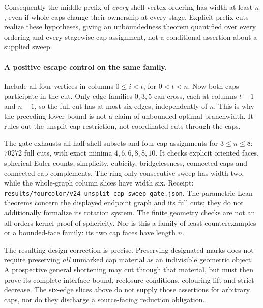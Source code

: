 Consequently the middle prefix of \emph{every} shell-vertex ordering
has width at least $n$, even if whole caps change their ownership at
every stage. Explicit prefix cuts realize these hypotheses, giving an
unboundedness theorem quantified over every ordering and every
stagewise cap assignment, not a conditional assertion about a supplied
sweep.

\paragraph{A positive escape control on the same family.}
Include all four vertices in columns $0\leq i<t$, for $0<t<n$.
Now both caps participate in the cut. Only edge families $0,3,5$
can cross, each at columns $t-1$ and $n-1$, so the full cut has at most
six edges, independently of $n$.
This is why the preceding lower bound is not a claim of unbounded
optimal branchwidth. It rules out the unsplit-cap restriction, not
coordinated cuts through the caps.

The gate exhausts all half-shell subsets and four cap assignments for
$3\leq n\leq8$: $70272$ full cuts, with exact minima
$4,6,6,8,8,10$. It checks explicit oriented faces, spherical Euler
counts, simplicity, cubicity, bridgelessness, connected caps and
connected cap complements. The ring-only consecutive sweep has width
two, while the whole-graph column slices have width six. Receipt:
\texttt{results/fourcolor/v24\_unsplit\_cap\_sweep\_gate.json}.
The parametric Lean theorems concern the displayed endpoint graph and
its full cuts; they do not additionally formalize its rotation system.
The finite geometry checks are not an all-orders kernel proof of
sphericity. Nor is this a family of least counterexamples or a
bounded-face family: its two cap faces have length $n$.

The resulting design correction is precise. Preserving designated
marks does not require preserving \emph{all} unmarked cap material as
an indivisible geometric object. A prospective general shortening may
cut through that material, but must then prove its complete-interface
bound, reclosure conditions, colouring lift and strict decrease. The
six-edge slices above do not supply those assertions for arbitrary
caps, nor do they discharge a source-facing reduction obligation.
